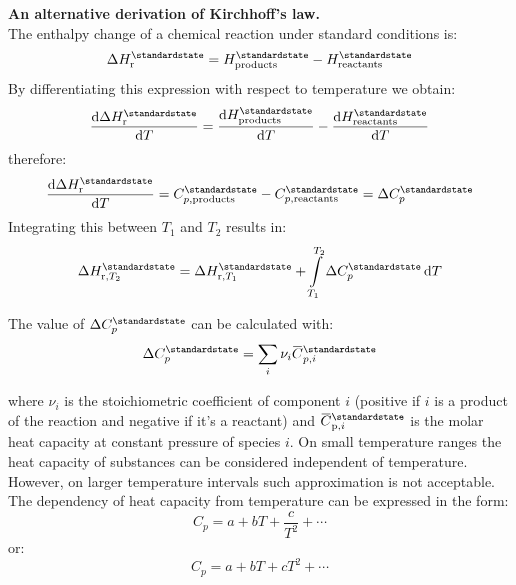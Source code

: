 \documentclass[12pt,a4paper]{report}
\newcommand*\diff{\mathop{}\!\mathrm{d}}
\newcommand{\overbar}[1]{\mkern 1.5mu\overline{\mkern-1.5mu#1\mkern-1.5mu}\mkern 1.5mu}
\begin{document}
\begin{mdframed}
\textbf{An alternative derivation of Kirchhoff's law.}\\
   The enthalpy change of a chemical reaction under standard conditions is:
   \begin{equation*}
   \Delta H^{\standardstate}_{\mathrm{r}}=H^{\standardstate}_{\mathrm{products}}-H^{\standardstate}_{\mathrm{reactants}}
   \end{equation*}
   By differentiating this expression with respect to temperature we obtain:
   \begin{equation*}
   \frac{\diff\Delta H^{\standardstate}_{\mathrm{r}}}{\diff T}=\frac{\diff H^{\standardstate}_{\mathrm{products}}}{\diff T}-\frac{\diff H^{\standardstate}_{\mathrm{reactants}}}{\diff T}
   \end{equation*}
   therefore:
   \begin{equation*}
   \frac{\diff\Delta H^{\standardstate}_{\mathrm{r}}}{\diff T}=C^{\standardstate}_{p,\mathrm{products}}-C^{\standardstate}_{p,\mathrm{reactants}}=\Delta C^{\standardstate}_{p}
   \end{equation*}
   Integrating this between $T_{1}$ and $T_{2}$ results in:
   \begin{equation*}
   \Delta H^{\standardstate}_{\mathrm{r},T_{2}}=\Delta H^{\standardstate}_{\mathrm{r},T_{1}}+\int\limits_{T_{1}}^{T_{2}}\Delta C^{\standardstate}_{p}\diff T
   \end{equation*}
\end{mdframed}
   The value  of $\Delta C^{\standardstate}_{p}$ can be calculated with:
   \begin{equation*}
   \Delta C^{\standardstate}_{p}=\sum\limits_{i}\nu_{i}\overbar{C}^{\standardstate}_{p,i}
   \end{equation*}

   where $\nu_{i}$ is the stoichiometric coefficient of component $i$ (positive if $i$ is a product of the reaction and negative if it's a reactant) and $\overbar{C}^{\standardstate}_{\mathrm{p},i}$ is the molar heat capacity at constant pressure of species $i$.
   On small temperature ranges the heat capacity of substances can be considered independent of temperature. However, on larger temperature intervals such approximation is not acceptable. The dependency of heat capacity from temperature can be expressed in the form:
  \begin{equation*}
  C_{p}=a+bT+\frac{c}{T^{2}}+\cdots
  \end{equation*}
  or:
    \begin{equation*}
  C_{p}=a+bT+cT^{2}+\cdots
  \end{equation*}
\end{document}
